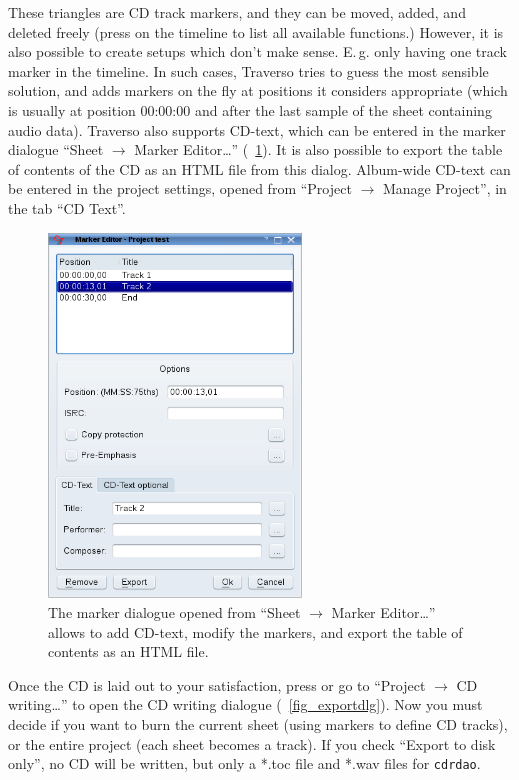 These triangles are CD track markers, and they can be moved, added, and deleted freely (press  on the timeline to list all available functions.) However, it is also possible to create setups which don't make sense. E.\,g. only having one track marker in the timeline. In such cases, Traverso tries to guess the most sensible solution, and adds markers on the fly at positions it considers appropriate (which is usually at position 00:00:00 and after the last sample of the sheet containing audio data). Traverso also supports CD-text, which can be entered in the marker dialogue ``Sheet $\rightarrow$ Marker Editor\dots'' (\FigB~\ref{fig_marker-editor}). It is also possible to export the table of contents of the CD as an HTML file from this dialog. Album-wide CD-text can be entered in the project settings, opened from ``Project $\rightarrow$ Manage Project'', in the tab ``CD Text''.

\begin{figure}[ht]
 \centering\includegraphics[width=0.6\textwidth]{../images/marker-editor}
 \caption{The marker dialogue opened from ``Sheet $\rightarrow$ Marker Editor\dots'' allows to add CD-text, modify the markers, and export the table of contents as an HTML file.}
 \label{fig_marker-editor}
\end{figure}

Once the CD is laid out to your satisfaction, press  or go to ``Project $\rightarrow$ CD writing\dots'' to open the CD writing dialogue (\FigB~\ref{fig_exportdlg}). Now you must decide if you want to burn the current sheet (using markers to define CD tracks), or the entire project (each sheet becomes a track). If you check ``Export to disk only'', no CD will be written, but only a *.toc file and *.wav files for \texttt{cdrdao}.

